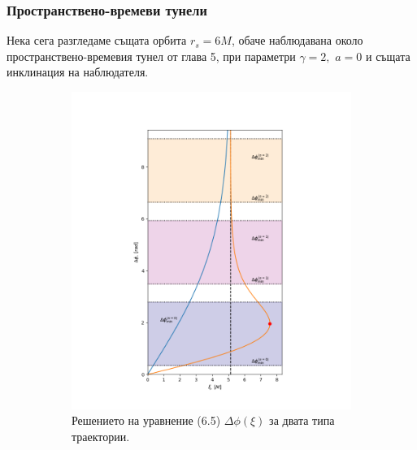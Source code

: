 \subsubsection{Пространствено-времеви тунели}
Нека сега разгледаме същата орбита $r_s = 6M$, обаче наблюдавана около пространствено-времевия тунел от глава 5, при параметри $\gamma = 2,\,\, a = 0$ и същата инклинация на наблюдателя.
\begin{figure}[h]
	\begin{subfigure}{5.7cm}
		\includegraphics[scale = 0.3]{WH_70_deg_r6_impact_gamma_2.png}
		\caption{Решението на уравнение (6.5) $\Delta\phi(\xi)$ за двата типа траектории.} \label{fig:1a}
	\end{subfigure}\,\,\,
	\begin{subfigure}{6cm}

\end{subfigure}
\end{figure}

